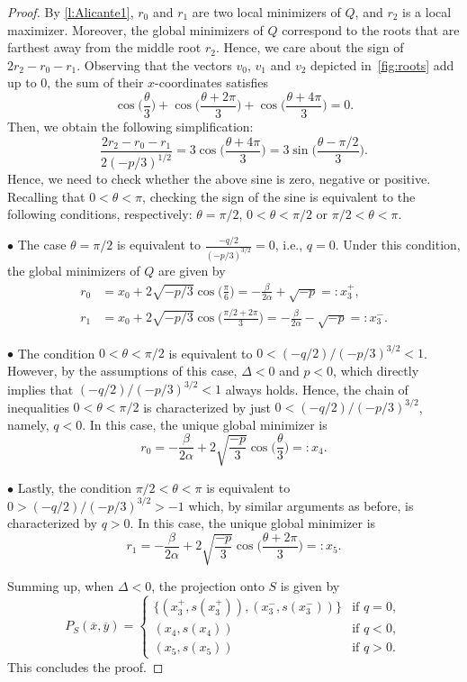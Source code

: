 \documentclass[11pt]{article}
\newcommand{\px}{\overline{x}}
\newcommand{\py}{\overline{y}}
\begin{document}
\begin{proof}
By \cref{l:Alicante1}, $r_0$ and $r_1$ are two local minimizers of $Q$,
and $r_2$ is a local maximizer. Moreover, the global minimizers of $Q$ correspond to the roots that are farthest away 
from the middle root $r_2$. Hence, we care about the sign of $2r_2 - r_0-r_1$.
Observing that the vectors $v_0$, $v_1$ and $v_2$ depicted in~\cref{fig:roots} add up to $0$, the sum of their $x$-coordinates satisfies 
$$\cos\Big(\frac{\theta}{3}\Big)+\cos\Big(\frac{\theta+2\pi}{3}\Big)+\cos\Big(\frac{\theta+4\pi}{3}\Big)=0.$$ 
Then, we obtain the following simplification:
\[\frac{2r_2 - r_0-r_1}{2(-p/3)^{1/2}}=3\cos\Big(\frac{\theta+4\pi}{3}\Big)=3\sin\Big(\frac{\theta-\pi/2}{3}\Big).\]
Hence, we need to check whether the above sine is zero, negative or positive. Recalling that $0<\theta<\pi$, checking the sign of the sine is equivalent to the following conditions, respectively: $\theta=\pi/2$, $0<\theta<\pi/2$ or $\pi/2<\theta<\pi$.

\noindent$\bullet$ The case $\theta=\pi/2$ is equivalent to $\frac{-q/2}{(-p/3)^{3/2}}=0$, i.e., $q=0$. Under this condition, the global minimizers of $Q$ are given by
\begin{align*}
    r_0&=x_0+2\sqrt{-p/3}\cos\Big(\frac{\pi}{6} \Big)=-\frac{\beta}{2\alpha}+\sqrt{-p}=:x_3^+,\\
    r_1&=x_0+2\sqrt{-p/3}\cos\Big(\frac{\pi/2+2\pi}{3} \Big)=
    -\frac{\beta}{2\alpha}-\sqrt{-p}=:x_3^-.
\end{align*}

\noindent$\bullet$ The condition $0<\theta<\pi/2$ is equivalent to $0 < (-q/2)/(-p/3)^{3/2}<1$. However, by the assumptions of this case, $\Delta<0$ and $p<0$, which directly implies that $(-q/2)/(-p/3)^{3/2}<1$ always holds. Hence, the chain of inequalities $0<\theta<\pi/2$ is characterized by just $0 < (-q/2)/(-p/3)^{3/2}$, namely, $q<0$. In this case, the unique global minimizer is
\[r_0=-\frac{\beta}{2\alpha}+2\sqrt{\frac{-p}{3}}\cos\Big(\frac{\theta}{3} \Big)=:x_4.\]

\noindent$\bullet$ Lastly, the condition {$\pi/2<\theta<\pi$} is equivalent to $0 > (-q/2)/(-p/3)^{3/2}>-1$ which, by similar arguments as before, is characterized by $q>0$. In this case, the unique global minimizer is
\[r_1=-\frac{\beta}{2\alpha}+2\sqrt{\frac{-p}{3}}\cos\Big(\frac{\theta+2\pi}{3} \Big)=:x_5.\]

Summing up, when $\Delta<0$, the projection onto $S$ is given by 
$$P_S(\px,\py)=\begin{cases}
    \{(x_3^+,s(x_3^+)),(x_3^-,s(x_3^-))\} & \text{if } q=0,\\
    (x_4,s(x_4)) &\text{if } q<0,\\
    (x_5,s(x_5)) &\text{if }q>0.
\end{cases}$$
This concludes the proof.
\end{proof}
\end{document}
